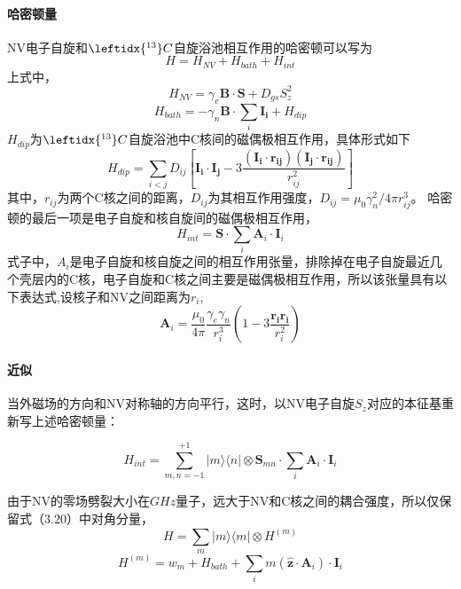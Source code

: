 \paragraph{哈密顿量}
NV电子自旋和$\leftidx{^{13}}C$自旋浴池相互作用的哈密顿可以写为
\begin{equation}
    H=H_{NV}+H_{bath}+H_{int}
\end{equation}
上式中，
\begin{equation}
    H_{NV}=\gamma_{e}\bm{B}\cdot\bm{S}+D_{gs}S_z^2
\end{equation}
\begin{equation}
    H_{bath}=-\gamma_{n} \bm{B}\cdot \sum_i \bm{I_i}+H_{dip}
\end{equation}
$H_{dip}$为$\leftidx{^{13}}C$自旋浴池中C核间的磁偶极相互作用，具体形式如下
\begin{equation}
    H_{dip}=\sum_{i<j} D_{ij} [\bm{I_i} \cdot \bm{I_j}-3\frac{(\bm{I_i}\cdot \bm{r_{ij}})(\bm{I_j}\cdot \bm{r_{ij}})}{r_{ij}^2}    ] 
\end{equation}
其中，$r_{ij}$为两个C核之间的距离，$D_{ij}$为其相互作用强度，$D_{ij}=\mu_0 \gamma_{n}^2 / 4 \pi r_{ij}^3$。
哈密顿的最后一项是电子自旋和核自旋间的磁偶极相互作用，
\begin{equation}
    H_{int}=\bm{S} \cdot \sum_i \bm{A}_i \cdot \bm{I}_i
\end{equation}
式子中，${A}_i$是电子自旋和核自旋之间的相互作用张量，排除掉在电子自旋最近几个壳层内的C核，电子自旋和C核之间主要是磁偶极相互作用，所以该张量具有以下表达式,设核子和NV之间距离为$r_i$,
\begin{equation}
    \bm{A}_i=\frac{\mu_0}{4 \pi}\frac{\gamma_e \gamma_n}{r_i^3}\left (1-3\frac{\bm{r_i}\bm{r_i}}{r_i^2}\right )
\end{equation}


\paragraph{近似}
当外磁场的方向和NV对称轴的方向平行，这时，以NV电子自旋$S_z$对应的本征基重新写上述哈密顿量：

\begin{equation}
 H_{int}=\sum_{m,n=-1}^{+1}|m\rangle\langle n| \otimes \bm{S}_{mn}\cdot \sum_i \bm{A}_i \cdot \bm{I}_i
\end{equation}

由于NV的零场劈裂大小在$\si{GHz}$量子，远大于NV和C核之间的耦合强度，所以仅保留式（3.20）中对角分量，
\begin{equation}
    H=\sum_{m} |m\rangle\langle m| \otimes H^{(m)}
\end{equation}
\begin{equation}
    H^{(m)}=w_m+H_{bath}+\sum_i m (\hat{\bm{z}} \cdot \bm{A}_i) \cdot \bm{I}_i
\end{equation}

